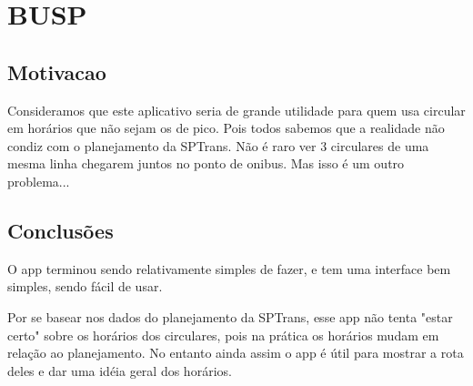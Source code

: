 \section{BUSP}

\subsection{Motivacao}
Consideramos que este aplicativo seria de grande utilidade para quem usa
circular em horários que não sejam os de pico. Pois todos sabemos que a
realidade não condiz com o planejamento da SPTrans. Não é raro ver
3 circulares de uma mesma linha chegarem juntos no ponto de onibus. Mas
isso é um outro problema...

\subsection{Conclusões}
O app terminou sendo relativamente simples de fazer, e tem uma interface 
bem simples, sendo fácil de usar.

Por se basear nos dados do planejamento da SPTrans, esse app não tenta
"estar certo" sobre os horários dos circulares, pois na prática os horários
mudam em relação ao planejamento. No entanto ainda assim o app é útil
para mostrar a rota deles e dar uma idéia geral dos horários.
